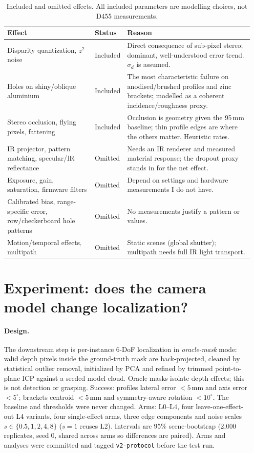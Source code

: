 \documentclass[10pt]{article}
\begin{document}
\begin{table}[ht]
\centering
\footnotesize
\begin{tabular}{@{}p{3.9cm}p{1.9cm}p{10.5cm}@{}}
\toprule
Effect & Status & Reason \\
\midrule
Disparity quantization, $z^2$ noise & Included & Direct consequence of sub-pixel stereo; dominant, well-understood error trend. $\sigma_d$ is assumed. \\
Holes on shiny/oblique aluminium & Included & The most characteristic failure on anodised/brushed profiles and zinc brackets; modelled as a coherent incidence/roughness proxy. \\
Stereo occlusion, flying pixels, fattening & Included & Occlusion is geometry given the 95\,mm baseline; thin profile edges are where the others matter. Heuristic rates. \\
IR projector, pattern matching, specular/IR reflectance & Omitted & Needs an IR renderer and measured material response; the dropout proxy stands in for the net effect. \\
Exposure, gain, saturation, firmware filters & Omitted & Depend on settings and hardware measurements I do not have. \\
Calibrated bias, range-specific error, row/checkerboard hole patterns & Omitted & No measurements justify a pattern or values. \\
Motion/temporal effects, multipath & Omitted & Static scenes (global shutter); multipath needs full IR light transport. \\
\bottomrule
\end{tabular}
\caption{Included and omitted effects. All included parameters are modelling choices, not D455 measurements.}
\label{tab:effects}
\end{table}

\section{Experiment: does the camera model change localization?}
\label{sec:exp}
\paragraph{Design.}
The downstream step is per-instance 6-DoF localization in \emph{oracle-mask} mode: valid depth pixels inside the ground-truth mask are back-projected, cleaned by statistical outlier removal, initialized by PCA and refined by trimmed point-to-plane ICP against a seeded model cloud. Oracle masks isolate depth effects; this is not detection or grasping. Success: profiles lateral error $<5$\,mm and axis error $<5^\circ$; brackets centroid $<5$\,mm and symmetry-aware rotation $<10^\circ$. The baseline and thresholds were never changed. Arms: L0--L4, four leave-one-effect-out L4 variants, four single-effect arms, three edge components and noise scales $s\in\{0.5,1,2,4,8\}$ ($s=1$ reuses L2). Intervals are 95\% scene-bootstrap (2,000 replicates, seed 0, shared across arms so differences are paired). Arms and analyses were committed and tagged \texttt{v2-protocol} before the test run.
\end{document}
